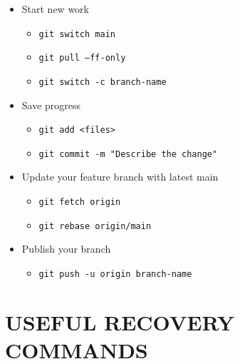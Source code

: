 \documentclass[a4paper,11pt]{article}
\begin{document}
\begin{itemize}
  \renewcommand{\labelitemi}{$\rightarrow$}

  \item Start new work
    \begin{itemize}
      \renewcommand{\labelitemii}{$\triangleright$}
      \item \texttt{git switch main}
      \item \texttt{git pull --ff-only}
      \item \texttt{git switch -c branch-name}
    \end{itemize}

  \item Save progress
    \begin{itemize}
      \renewcommand{\labelitemii}{$\triangleright$}
      \item \texttt{git add <files>}
      \item \texttt{git commit -m "Describe the change"}
    \end{itemize}

  \item Update your feature branch with latest main
    \begin{itemize}
      \renewcommand{\labelitemii}{$\triangleright$}
      \item \texttt{git fetch origin}
      \item \texttt{git rebase origin/main}
    \end{itemize}

  \item Publish your branch
    \begin{itemize}
      \renewcommand{\labelitemii}{$\triangleright$}
      \item \texttt{git push -u origin branch-name}
    \end{itemize}

\end{itemize}

\section*{USEFUL RECOVERY COMMANDS}
\end{document}
